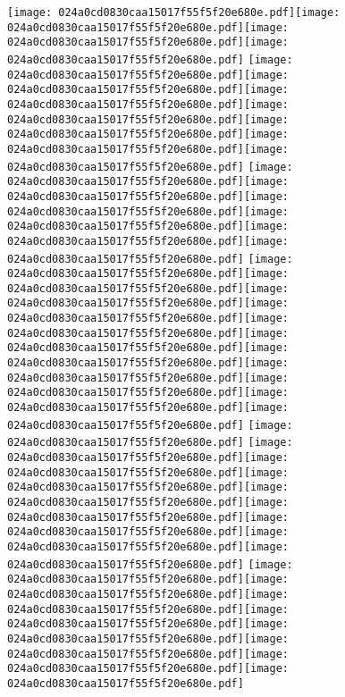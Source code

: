 \documentclass{article}
\newcommand{\origpg}[2]{\texttt{[image: 024a0cd0830caa15017f55f5f20e680e.pdf]}}
\begin{document}
{\vspace{28.908pt}\hspace{35.438pt}\origpg3{120.74pt 740.51pt 132.39pt 756.65pt}\origpg3{132.3pt 740.51pt 139.46pt 756.65pt}\hspace{-0.178pt}\origpg3{139.29pt 740.51pt 147.34pt 756.65pt}\origpg3{147.24pt 740.51pt 154.6pt 756.65pt} \origpg3{166.29pt 740.51pt 173.34pt 756.65pt}\origpg3{173.28pt 740.51pt 180.45pt 756.65pt}\hspace{-0.178pt}\origpg3{180.27pt 740.51pt 188.11pt 756.65pt}\origpg3{188.21pt 740.51pt 196.28pt 756.65pt}\hspace{-0.355pt}\origpg3{195.92pt 740.51pt 208.35pt 756.65pt}\origpg3{208.43pt 740.51pt 215.6pt 756.65pt}\hspace{-0.178pt}\origpg3{215.42pt 740.51pt 224.06pt 756.65pt} \origpg3{235.7pt 740.51pt 243.77pt 756.65pt}\origpg3{243.87pt 740.51pt 251.03pt 756.65pt}\origpg3{251.08pt 740.51pt 259.3pt 756.65pt}\origpg3{259.3pt 740.51pt 267.37pt 756.65pt}\hspace{-0.387pt}\origpg3{266.98pt 740.51pt 274.03pt 756.65pt}\origpg3{273.97pt 740.51pt 284.82pt 756.65pt} \origpg3{296.36pt 740.51pt 302.73pt 756.65pt}\hspace{-0.113pt}\origpg3{302.62pt 740.51pt 309.78pt 756.65pt}\origpg3{309.83pt 740.51pt 317.68pt 756.65pt}\origpg3{317.77pt 740.51pt 325.83pt 756.65pt}\origpg3{325.73pt 740.51pt 337.79pt 756.65pt}\hspace{-0.742pt}\origpg3{337.05pt 740.51pt 345.16pt 756.65pt}\origpg3{345.21pt 740.51pt 352.38pt 756.65pt}\origpg3{352.43pt 740.51pt 359.59pt 756.65pt}\hspace{-0.178pt}\origpg3{359.42pt 740.51pt 366.47pt 756.65pt}\origpg3{366.4pt 740.51pt 373.57pt 756.65pt}\origpg3{373.62pt 740.51pt 381.04pt 756.65pt} \origpg3{392.81pt 740.51pt 400.43pt 756.65pt} \origpg3{412.05pt 740.51pt 420.68pt 756.65pt}\origpg3{420.68pt 740.51pt 427.06pt 756.65pt}\hspace{-0.323pt}\origpg3{426.73pt 740.51pt 434.8pt 756.65pt}\hspace{-0.355pt}\origpg3{434.45pt 740.51pt 442.57pt 756.65pt}\origpg3{442.62pt 740.51pt 449.78pt 756.65pt}\hspace{-0.178pt}\origpg3{449.61pt 740.51pt 458.24pt 756.65pt}\origpg3{458.24pt 740.51pt 466.88pt 756.65pt}\origpg3{466.94pt 740.51pt 475.57pt 756.65pt} \origpg3{487.16pt 740.51pt 495.38pt 756.65pt}\origpg3{495.38pt 740.51pt 504.01pt 756.65pt}\hspace{-0.226pt}\origpg3{503.79pt 740.51pt 512.42pt 756.65pt}\origpg3{512.42pt 740.51pt 519.59pt 756.65pt}\origpg3{519.67pt 740.51pt 529.89pt 756.65pt}\origpg3{529.79pt 740.51pt 538.43pt 756.65pt}\hspace{-0.21pt}\origpg3{538.22pt 740.51pt 546.06pt 756.65pt}\origpg3{546.16pt 740.51pt 554.79pt 756.65pt} 

}
\end{document}
